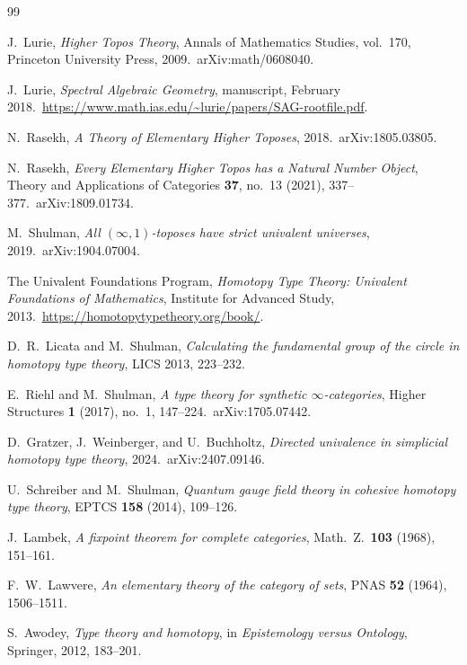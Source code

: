 \documentclass[12pt]{article}
\theoremstyle{definition}
\theoremstyle{remark}
\begin{document}
\begin{thebibliography}{99}

 J.~Lurie, \emph{Higher Topos Theory}, Annals of Mathematics Studies, vol.~170, Princeton University Press, 2009.\ arXiv:math/0608040.

 J.~Lurie, \emph{Spectral Algebraic Geometry}, manuscript, February 2018.\ \url{https://www.math.ias.edu/~lurie/papers/SAG-rootfile.pdf}.

 N.~Rasekh, \emph{A Theory of Elementary Higher Toposes}, 2018.\ arXiv:1805.03805.

 N.~Rasekh, \emph{Every Elementary Higher Topos has a Natural Number Object}, Theory and Applications of Categories \textbf{37}, no.~13 (2021), 337--377.\ arXiv:1809.01734.

 M.~Shulman, \emph{All $(\infty,1)$-toposes have strict univalent universes}, 2019.\ arXiv:1904.07004.

 The Univalent Foundations Program, \emph{Homotopy Type Theory: Univalent Foundations of Mathematics}, Institute for Advanced Study, 2013.\ \url{https://homotopytypetheory.org/book/}.

 D.~R.~Licata and M.~Shulman, \emph{Calculating the fundamental group of the circle in homotopy type theory}, LICS 2013, 223--232.

 E.~Riehl and M.~Shulman, \emph{A type theory for synthetic $\infty$-categories}, Higher Structures \textbf{1} (2017), no.~1, 147--224.\ arXiv:1705.07442.

 D.~Gratzer, J.~Weinberger, and U.~Buchholtz, \emph{Directed univalence in simplicial homotopy type theory}, 2024.\ arXiv:2407.09146.

 U.~Schreiber and M.~Shulman, \emph{Quantum gauge field theory in cohesive homotopy type theory}, EPTCS \textbf{158} (2014), 109--126.

 J.~Lambek, \emph{A fixpoint theorem for complete categories}, Math.\ Z.\ \textbf{103} (1968), 151--161.

 F.~W.~Lawvere, \emph{An elementary theory of the category of sets}, PNAS \textbf{52} (1964), 1506--1511.

 S.~Awodey, \emph{Type theory and homotopy}, in \emph{Epistemology versus Ontology}, Springer, 2012, 183--201.


\end{thebibliography}
\end{document}
